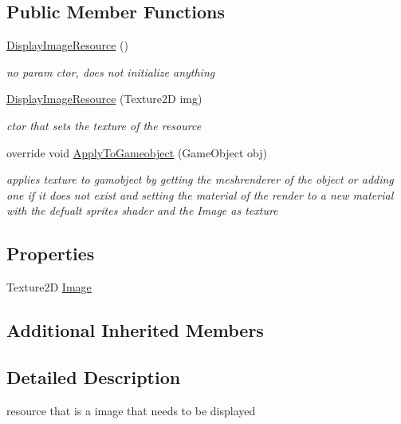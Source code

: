 \subsection*{Public Member Functions}
\begin{DoxyCompactItemize}
\item 
\mbox{\hyperlink{class_display_image_resource_a8c3e434da20e617201d74cfdb913817b}{Display\+Image\+Resource}} ()
\begin{DoxyCompactList}\small\item\em no param ctor, does not initialize anything \end{DoxyCompactList}\item 
\mbox{\hyperlink{class_display_image_resource_aa7b4bf3e8d324ea5b789322748b21b8e}{Display\+Image\+Resource}} (Texture2D img)
\begin{DoxyCompactList}\small\item\em ctor that sets the texture of the resource \end{DoxyCompactList}\item 
override void \mbox{\hyperlink{class_display_image_resource_a26992a5ecb6c449d85539cc5d07112e2}{Apply\+To\+Gameobject}} (Game\+Object obj)
\begin{DoxyCompactList}\small\item\em applies texture to gamobject by getting the meshrenderer of the object or adding one if it does not exist and setting the material of the render to a new material with the defualt sprites shader and the Image as texture \end{DoxyCompactList}\end{DoxyCompactItemize}
\subsection*{Properties}
\begin{DoxyCompactItemize}
\item 
Texture2D \mbox{\hyperlink{class_display_image_resource_a6268f6612b7c533eafc2b6c8f91c2925}{Image}}
\end{DoxyCompactItemize}
\subsection*{Additional Inherited Members}


\subsection{Detailed Description}
resource that is a image that needs to be displayed 



